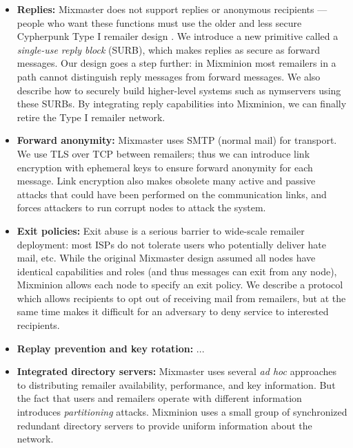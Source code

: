 \documentclass[11pt]{IEEEtran}
\begin{document}
\begin{itemize}
\item \textbf{Replies:} Mixmaster does not support replies or anonymous
recipients --- people who want these functions must use the older and
less secure Cypherpunk Type I remailer design \cite{remailer-history}. We
introduce a new primitive called a \emph{single-use reply block} (SURB),
which makes replies as secure as forward messages. Our design goes a
step further: in Mixminion most remailers in a path cannot distinguish
reply messages from forward messages. We also describe how to securely
build higher-level systems such as nymservers using these SURBs. By
integrating reply capabilities into Mixminion, we can finally retire
the Type I remailer network.

\item \textbf{Forward anonymity:} Mixmaster uses SMTP (normal mail) for
transport. We use TLS over TCP between remailers; thus we can introduce
link encryption with ephemeral keys to ensure forward anonymity for
each message. Link encryption also makes obsolete many active and
passive attacks that could have been performed on the communication
links, and forces attackers to run corrupt nodes to attack the
system. 


\item \textbf{Exit policies:} Exit abuse is a serious barrier to wide-scale
remailer deployment: most ISPs do not tolerate users who potentially
deliver hate mail, etc. While the original Mixmaster design assumed all
nodes have identical capabilities and roles (and thus messages can exit
from any node), Mixminion allows each node to specify an exit policy. We
describe a protocol which allows recipients to opt out of receiving mail
from remailers, but at the same time makes it difficult for an adversary
to deny service to interested recipients.

\item \textbf{Replay prevention and key rotation:} ...

\item \textbf{Integrated directory servers:} Mixmaster uses several \emph{ad hoc}
approaches to distributing remailer availability, performance, and
key information. But the fact that users and remailers operate with
different information introduces \emph{partitioning} attacks. Mixminion
uses a small group of synchronized redundant directory servers
to provide uniform information about the network.


\end{itemize}
\end{document}
